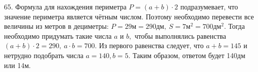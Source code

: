 65. Формула для нахождения периметра $P=(a+b)\cdot2$ подразумевает, что значение периметра является чётным числом. Поэтому необходимо перевести все величины из метров в дециметры: $P=29\text{м}=290\text{дм},\ S=7\text{м}^2=700\text{дм}^2.$ Тогда необходимо придумать такие числа $a$ и $b,$ чтобы выполнялись равенства $(a+b)\cdot2=290,\ a\cdot b=700.$ Из первого равенства следует, что $a+b=145$ и нетрудно подобрать числа $a=140, b=5.$ Таким образом, ответом будет 140дм или 14м.\\

